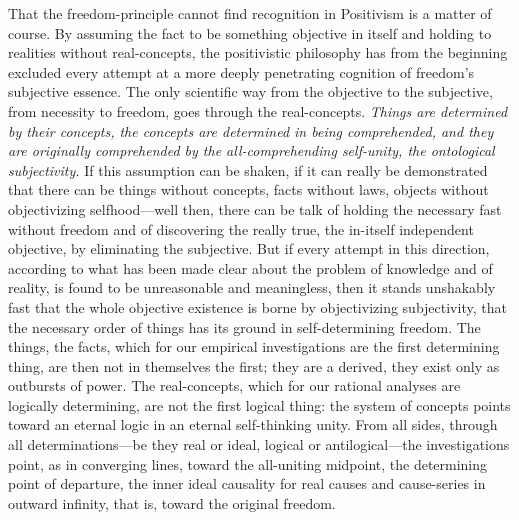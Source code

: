 \documentclass[12pt]{article}
\begin{document}
That the freedom-principle cannot find recognition in Positivism is a matter
of course. By assuming the fact to be something objective in itself and
holding to realities without real-concepts, the positivistic philosophy has
from the beginning excluded every attempt at a more deeply penetrating
cognition of freedom's subjective essence. The only scientific way from the
objective to the subjective, from necessity to freedom, goes through the
real-concepts. \emph{Things are determined
by their concepts, the concepts are determined in being comprehended, and they
are originally comprehended by the all-comprehending self-unity, the
ontological subjectivity.} If this assumption can be shaken, if it can really
be demonstrated that there can be things without concepts, facts without laws,
objects without objectivizing selfhood—well then, there can be talk of holding
the necessary fast without freedom and of discovering the really true, the
in-itself independent objective, by eliminating the subjective. But if every
attempt in this direction, according to what has been made clear about the
problem of knowledge and of reality, is found to be unreasonable and
meaningless, then it stands unshakably fast that the whole objective existence
is borne by objectivizing subjectivity, that the necessary order of things has
its ground in self-determining freedom. The things, the facts, which for our
empirical investigations are the first determining thing, are then not in
themselves the first; they are a derived, they exist only as outbursts of
power. The real-concepts, which for our rational analyses are logically
determining, are not the first logical thing: the system of concepts points
toward an eternal logic in an eternal self-thinking unity. From all sides,
through all determinations—be they real or ideal, logical or antilogical—the
investigations point, as in converging lines, toward the all-uniting midpoint,
the determining point of departure, the inner ideal causality for real causes
and cause-series in outward infinity, that is, toward the original freedom.
\end{document}
